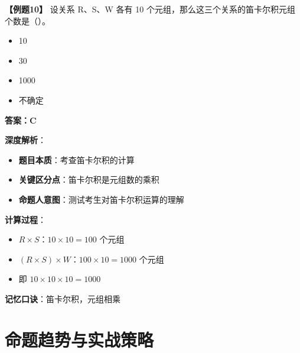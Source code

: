\documentclass[12pt, a4paper]{article}
\newenvironment{bluebox}[1]{%
  \begin{trivlist}
  \item[\hskip\labelsep \textbf{#1}]
  \setlength{\parskip}{0.5ex}
  \setlength{\itemsep}{0.5ex}
}{%
  \end{trivlist}
}
\begin{document}
\begin{bluebox}{例题10：笛卡尔积}
	\textbf{【例题10】} 设关系 R、S、W 各有 10 个元组，那么这三个关系的笛卡尔积元组个数是（\quad）。

	\begin{itemize}
		\item[A)] 10
		\item[B)] 30
		\item[C)] 1000
		\item[D)] 不确定
	\end{itemize}

	\textbf{答案：C}

	\textbf{深度解析}：

	\begin{itemize}
		\item \textbf{题目本质}：考查笛卡尔积的计算
		\item \textbf{关键区分点}：笛卡尔积是元组数的乘积
		\item \textbf{命题人意图}：测试考生对笛卡尔积运算的理解
	\end{itemize}

	\textbf{计算过程}：

	\begin{itemize}
		\item $R \times S$：$10 \times 10 = 100$ 个元组
		\item $(R \times S) \times W$：$100 \times 10 = 1000$ 个元组
		\item 即 $10 \times 10 \times 10 = 1000$
	\end{itemize}

	\textbf{记忆口诀}：笛卡尔积，元组相乘
\end{bluebox}

\section{命题趋势与实战策略}
\end{document}
